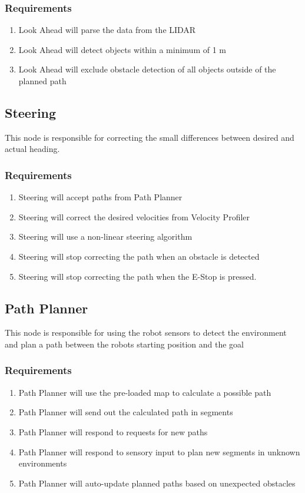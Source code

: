   \subsubsection{Requirements}
  \begin{enumerate}
  \item Look Ahead will parse the data from the LIDAR
  \item Look Ahead will detect objects within a minimum of 1 m
    \item Look Ahead will exclude obstacle detection of all objects
      outside of the planned path
      \end{enumerate}

  \subsection{Steering}
  This node is responsible for correcting the small differences
  between desired and actual heading.
  
  \subsubsection{Requirements}

  \begin{enumerate}
  \item Steering will accept paths from Path Planner
    \item Steering will correct the desired velocities from Velocity
      Profiler
    \item Steering will use a non-linear steering algorithm
      \item Steering will stop correcting the path when an obstacle is
detected
\item Steering will stop correcting the path when the E-Stop is pressed.
    \end{enumerate}

  \subsection{Path Planner}
  This node is responsible for using the robot sensors to detect the
  environment and plan a path between the robots starting position and
  the goal

  \subsubsection{Requirements}

  \begin{enumerate}
\item Path Planner will use the pre-loaded map to calculate a possible
  path
\item Path Planner will send out the calculated path in segments
\item Path Planner will respond to requests for new paths
  \item Path Planner will respond to sensory input to plan new
    segments in unknown environments
    \item Path Planner will auto-update planned paths based on
      unexpected obstacles
    \end{enumerate}

